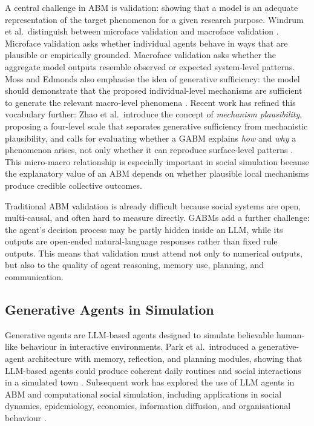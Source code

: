 \documentclass[11pt]{article}
\begin{document}
A central challenge in ABM is validation: showing that a model is an adequate representation
of the target phenomenon for a given research purpose. Windrum et al.\ distinguish between
microface validation and macroface validation \cite{windrum2007empirical}. Microface validation
asks whether individual agents behave in ways that are plausible or empirically grounded.
Macroface validation asks whether the aggregate model outputs resemble observed or expected
system-level patterns. Moss and Edmonds also emphasise the idea of generative sufficiency:
the model should demonstrate that the proposed individual-level mechanisms are sufficient to
generate the relevant macro-level phenomena \cite{moss2005towards}. Recent work has refined
this vocabulary further: Zhao et al.\ introduce the concept of \emph{mechanism plausibility},
proposing a four-level scale that separates generative sufficiency from mechanistic
plausibility, and calls for evaluating whether a GABM explains \emph{how} and \emph{why}
a phenomenon arises, not only whether it can reproduce surface-level patterns
\cite{zhao2026mechanism}. This micro-macro relationship is especially important in social
simulation because the explanatory value of an ABM depends on whether plausible local
mechanisms produce credible collective outcomes.

Traditional ABM validation is already difficult because social systems are open,
multi-causal, and often hard to measure directly. GABMs add a further challenge: the
agent's decision process may be partly hidden inside an LLM, while its outputs are
open-ended natural-language responses rather than fixed rule outputs. This means that
validation must attend not only to numerical outputs, but also to the quality of agent
reasoning, memory use, planning, and communication.

\subsection{Generative Agents in Simulation}
Generative agents are LLM-based agents designed to simulate believable human-like behaviour
in interactive environments. Park et al.\ introduced a generative-agent architecture with
memory, reflection, and planning modules, showing that LLM-based agents could produce
coherent daily routines and social interactions in a simulated town
\cite{park2023generative}. Subsequent work has explored the use of LLM agents in ABM and
computational social simulation, including applications in social dynamics, epidemiology,
economics, information diffusion, and organisational behaviour
\cite{gao2024survey, ma2024computational, ghaffarzadegan2024tutorial}.
\end{document}
